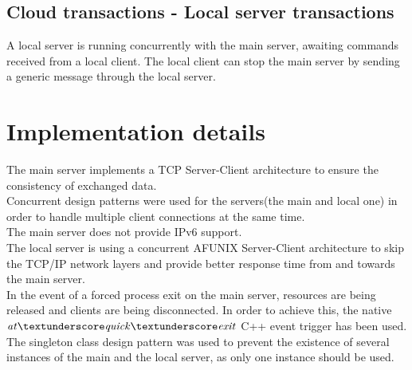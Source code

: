 \documentclass[runningheads]{llncs}
\begin{document}
\subsection{Cloud transactions - Local server transactions}
A local server is running concurrently with the main server, awaiting commands received from a local client. The local client can stop the main server by sending a generic message through the local server.\\

\section{Implementation details}
The main server implements a TCP Server-Client architecture to ensure the consistency of exchanged data.\\
Concurrent design patterns were used for the servers(the main and local one) in order to handle multiple client connections at the same time.\\
The main server does not provide IPv6 support.\\
The local server is using a concurrent AF\textunderscore UNIX Server-Client architecture to skip the TCP/IP network layers and provide better response time from and towards the main server.\\
In the event of a forced process exit on the main server, resources are being released and clients are being disconnected. In order to achieve this, the native $\it {at\textunderscore quick\textunderscore exit}$ C++ event trigger has been used.\\
The singleton class design pattern was used to prevent the existence of several instances of the main and the local server, as only one instance should be used.
\end{document}
